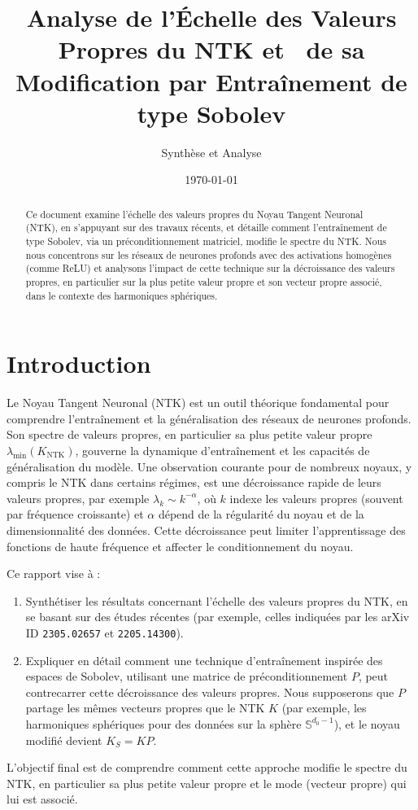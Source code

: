 \documentclass{article}
\title{Analyse de l'Échelle des Valeurs Propres du NTK et \ de sa Modification par Entraînement de type Sobolev}
\author{Synthèse et Analyse}
\date{\today}
\newcommand{\KNTK}{K_{\text{NTK}}}
\newcommand{\lambdaMin}{\lambda_{\min}}
\begin{document}
\maketitle

\begin{abstract}
Ce document examine l'échelle des valeurs propres du Noyau Tangent Neuronal (NTK), en s'appuyant sur des travaux récents, et détaille comment l'entraînement de type Sobolev, via un préconditionnement matriciel, modifie le spectre du NTK. Nous nous concentrons sur les réseaux de neurones profonds avec des activations homogènes (comme ReLU) et analysons l'impact de cette technique sur la décroissance des valeurs propres, en particulier sur la plus petite valeur propre et son vecteur propre associé, dans le contexte des harmoniques sphériques.
\end{abstract}

\tableofcontents
\newpage

\section{Introduction}

Le Noyau Tangent Neuronal (NTK) est un outil théorique fondamental pour comprendre l'entraînement et la généralisation des réseaux de neurones profonds. Son spectre de valeurs propres, en particulier sa plus petite valeur propre $\lambdaMin(\KNTK)$, gouverne la dynamique d'entraînement et les capacités de généralisation du modèle. Une observation courante pour de nombreux noyaux, y compris le NTK dans certains régimes, est une décroissance rapide de leurs valeurs propres, par exemple $\lambda_k \sim k^{-\alpha}$, où $k$ indexe les valeurs propres (souvent par fréquence croissante) et $\alpha$ dépend de la régularité du noyau et de la dimensionnalité des données. Cette décroissance peut limiter l'apprentissage des fonctions de haute fréquence et affecter le conditionnement du noyau.

Ce rapport vise à :
\begin{enumerate}
    \item Synthétiser les résultats concernant l'échelle des valeurs propres du NTK, en se basant sur des études récentes (par exemple, celles indiquées par les arXiv ID \texttt{2305.02657} et \texttt{2205.14300}).
    \item Expliquer en détail comment une technique d'entraînement inspirée des espaces de Sobolev, utilisant une matrice de préconditionnement $P$, peut contrecarrer cette décroissance des valeurs propres. Nous supposerons que $P$ partage les mêmes vecteurs propres que le NTK $K$ (par exemple, les harmoniques sphériques pour des données sur la sphère $\mathbb{S}^{d_0-1}$), et le noyau modifié devient $K_S = KP$.
\end{enumerate}
L'objectif final est de comprendre comment cette approche modifie le spectre du NTK, en particulier sa plus petite valeur propre et le mode (vecteur propre) qui lui est associé.
\end{document}
